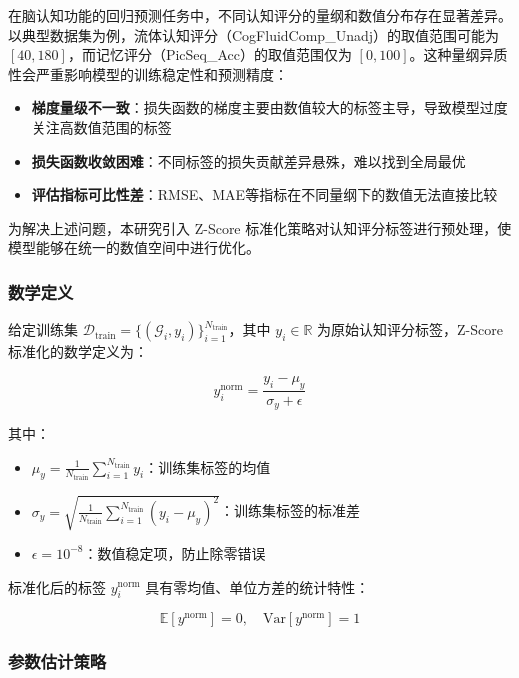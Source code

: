 在脑认知功能的回归预测任务中，不同认知评分的量纲和数值分布存在显著差异。以典型数据集为例，流体认知评分（CogFluidComp\_Unadj）的取值范围可能为 $[40, 180]$，而记忆评分（PicSeq\_Acc）的取值范围仅为 $[0, 100]$。这种量纲异质性会严重影响模型的训练稳定性和预测精度：

\begin{itemize}
    \item \textbf{梯度量级不一致}：损失函数的梯度主要由数值较大的标签主导，导致模型过度关注高数值范围的标签
    \item \textbf{损失函数收敛困难}：不同标签的损失贡献差异悬殊，难以找到全局最优
    \item \textbf{评估指标可比性差}：RMSE、MAE等指标在不同量纲下的数值无法直接比较
\end{itemize}

为解决上述问题，本研究引入 Z-Score 标准化策略对认知评分标签进行预处理，使模型能够在统一的数值空间中进行优化。

\subsubsection{数学定义}

给定训练集 $\mathcal{D}_{\text{train}} = \{(\mathcal{G}_i, y_i)\}_{i=1}^{N_{\text{train}}}$，其中 $y_i \in \mathbb{R}$ 为原始认知评分标签，Z-Score 标准化的数学定义为：

\begin{equation}
y_i^{\text{norm}} = \frac{y_i - \mu_y}{\sigma_y + \epsilon}
\end{equation}

其中：
\begin{itemize}
    \item $\mu_y = \frac{1}{N_{\text{train}}} \sum_{i=1}^{N_{\text{train}}} y_i$：训练集标签的均值
    \item $\sigma_y = \sqrt{\frac{1}{N_{\text{train}}} \sum_{i=1}^{N_{\text{train}}} (y_i - \mu_y)^2}$：训练集标签的标准差
    \item $\epsilon = 10^{-8}$：数值稳定项，防止除零错误
\end{itemize}

标准化后的标签 $y_i^{\text{norm}}$ 具有零均值、单位方差的统计特性：

\begin{equation}
\mathbb{E}[y^{\text{norm}}] = 0, \quad \text{Var}[y^{\text{norm}}] = 1
\end{equation}

\subsubsection{参数估计策略}


